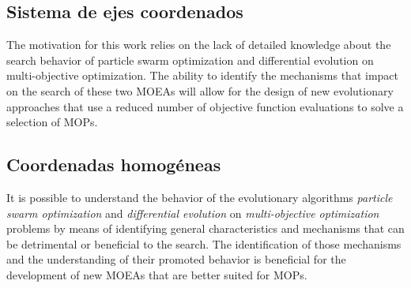 
\subsection{Sistema de ejes coordenados}

The motivation for this work relies on the lack of detailed knowledge about the search behavior of particle swarm optimization and differential evolution on multi-objective optimization. The ability to identify the mechanisms that impact on the search of these two MOEAs will allow for the design of new evolutionary approaches that use a reduced number of objective function evaluations to solve a selection of MOPs. 

\subsection{Coordenadas homogéneas}

It is possible to understand the behavior of the evolutionary algorithms \emph{particle swarm optimization} and \emph{differential evolution} on \emph{multi-objective optimization} problems  by means of identifying general characteristics and mechanisms that can be detrimental or beneficial to the search. The identification of those mechanisms and the understanding of their promoted behavior is beneficial for the development of new MOEAs that are better suited for MOPs. 

